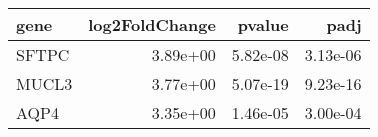 \begin{tabular}{lrrr}
\toprule
 gene &  log2FoldChange &   pvalue &     padj \\
\midrule
SFTPC &        3.89e+00 & 5.82e-08 & 3.13e-06 \\
MUCL3 &        3.77e+00 & 5.07e-19 & 9.23e-16 \\
 AQP4 &        3.35e+00 & 1.46e-05 & 3.00e-04 \\
\bottomrule
\end{tabular}
